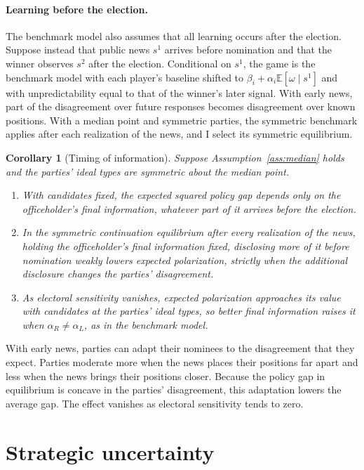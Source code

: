 \documentclass[12pt,letterpaper]{article}
\newtheorem{corollary}{Corollary}
\begin{document}
\paragraph{Learning before the election.}
The benchmark model also assumes that all learning occurs after the election. Suppose instead that public news $s^1$ arrives before nomination and that the winner observes $s^2$ after the election. Conditional on $s^1$, the game is the benchmark model with each player's baseline shifted to $\beta_i+\alpha_i\mathbb{E}[\omega\mid s^1]$ and with unpredictability equal to that of the winner's later signal. With early news, part of the disagreement over future responses becomes disagreement over known positions. With a median point and symmetric parties, the symmetric benchmark applies after each realization of the news, and I select its symmetric equilibrium.

\begin{corollary}[Timing of information]\label{cor:timing}
Suppose Assumption~\ref{ass:median} holds and the parties' ideal types are symmetric about the median point.
\begin{enumerate}
  \item[(a)] With candidates fixed, the expected squared policy gap depends only on the officeholder's final information, whatever part of it arrives before the election.
  \item[(b)] In the symmetric continuation equilibrium after every realization of the news, holding the officeholder's final information fixed, disclosing more of it before nomination weakly lowers expected polarization, strictly when the additional disclosure changes the parties' disagreement.
  \item[(c)] As electoral sensitivity vanishes, expected polarization approaches its value with candidates at the parties' ideal types, so better final information raises it when $\alpha_R\ne\alpha_L$, as in the benchmark model.
\end{enumerate}
\end{corollary}

With early news, parties can adapt their nominees to the disagreement that they expect. Parties moderate more when the news places their positions far apart and less when the news brings their positions closer. Because the policy gap in equilibrium is concave in the parties' disagreement, this adaptation lowers the average gap. The effect vanishes as electoral sensitivity tends to zero.


\section{Strategic uncertainty}\label{sec:pre-election}
\end{document}
